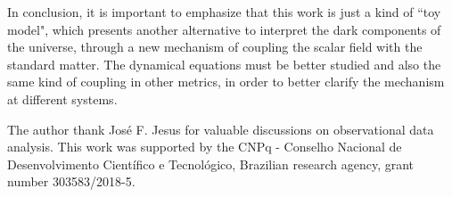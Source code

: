 \documentclass[preprintnumbers,amsmath,amssymb,nofootinbib]{revtex4}
\begin{document}
In conclusion, it is important to emphasize that this work is just a kind of ``toy model", which presents another alternative to interpret the dark components of the universe, through a new mechanism of coupling the scalar field with the standard matter. The dynamical equations must be better studied and also the same kind of coupling in other metrics, in order to better clarify the mechanism at different systems.

\begin{acknowledgements}
The author thank Jos\'e F. Jesus for valuable discussions on observational data analysis. This work was supported by the CNPq - Conselho Nacional de Desenvolvimento Cient\'ifico e Tecnol\'ogico, Brazilian research agency, grant number 303583/2018-5.  
\end{acknowledgements}
\end{document}
